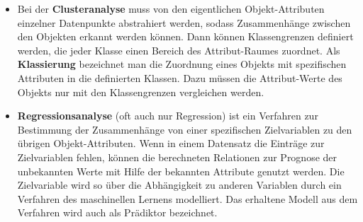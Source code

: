 \documentclass[
	12pt,
	a4paper,
	BCOR10mm,
	DIV14,
	listof=totoc,
	bibliography=totoc,
	headsepline
]{scrreprt}
\begin{document}
\begin{itemize}
\item Bei der \textbf{Clusteranalyse} muss von den eigentlichen Objekt-Attributen einzelner Datenpunkte abstrahiert werden, sodass Zusammenhänge zwischen den Objekten erkannt werden können. Dann können Klassengrenzen definiert werden, die jeder Klasse einen Bereich des Attribut-Raumes zuordnet.
Als \textbf{Klassierung} bezeichnet man die Zuordnung eines Objekts mit spezifischen Attributen in die definierten Klassen. Dazu müssen die Attribut-Werte des Objekts nur mit den Klassengrenzen vergleichen werden.
\item \textbf{Regressionsanalyse} (oft auch nur Regression) ist ein Verfahren zur Bestimmung der Zusammenhänge von einer spezifischen Zielvariablen zu den übrigen Objekt-Attributen. Wenn in einem Datensatz die Einträge zur Zielvariablen fehlen, können die berechneten Relationen zur Prognose der unbekannten Werte mit Hilfe der bekannten Attribute genutzt werden. Die Zielvariable wird so über die Abhängigkeit zu anderen Variablen durch ein Verfahren des maschinellen Lernens modelliert. Das erhaltene Modell aus dem Verfahren wird auch als Prädiktor bezeichnet. 	
\end{itemize}
\end{document}
